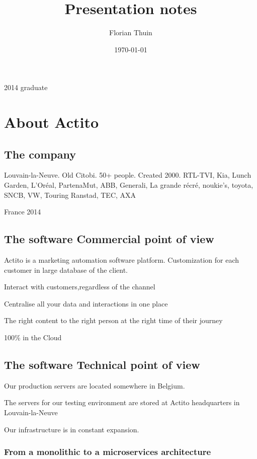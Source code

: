 \documentclass[a4paper, 11pt]{article}
\author{Florian Thuin}
\date{\today}
\title{Presentation notes}
\begin{document}
    \maketitle
    \tableofcontents

    2014 graduate

    \section{About Actito}

    \subsection{The company}

    Louvain-la-Neuve. Old Citobi. 50+ people. Created 2000. RTL-TVI, Kia, Lunch Garden,
    L'Oréal, PartenaMut, ABB, Generali, La grande récré, noukie's, toyota, SNCB, VW, Touring
    Ranstad, TEC, AXA

    France 2014

    \subsection{The software \textemdash{} Commercial point of view}

    Actito is a marketing automation software platform. Customization for each
    customer in large database of the client.

    Interact with customers,regardless of the channel

    Centralise all your data and interactions in one place

    The right content to the right person at the right time of their journey

    100\% in the Cloud

    \subsection{The software \textemdash{} Technical point of view}

    Our production servers are located somewhere in Belgium.

    The servers for our testing environment are stored at Actito headquarters in
    Louvain-la-Neuve

    Our infrastructure is in constant expansion.

    \subsubsection{From a monolithic to a microservices architecture}
\end{document}
